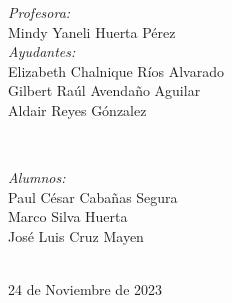 \begin{titlepage}
\vspace{10mm}
\begin{minipage}{0.7\textwidth}
    \begin{flushleft} \large
        \emph{Profesora:}\\
            Mindy Yaneli Huerta Pérez \\
            \vspace{3mm}
            \emph{Ayudantes:}\\
            Elizabeth Chalnique Ríos Alvarado \\
            Gilbert Raúl Avendaño Aguilar \\
            Aldair Reyes Gónzalez
    \end{flushleft}
\end{minipage}
\\
\vspace{20mm}
\begin{minipage}{0.4\textwidth}
    \begin{flushright} \large
    \centering
        \emph{Alumnos:} \\ %
        \vspace{4mm}
        Paul César Cabañas Segura\\
        \vspace{3mm}
        Marco Silva Huerta \\                
        \vspace{3mm}        
        José Luis Cruz Mayen
    \end{flushright}
\end{minipage}\\[1.5cm]
\makeatother
{\large 24 de Noviembre de 2023}\\[2cm]
\vfill 
\end{titlepage}